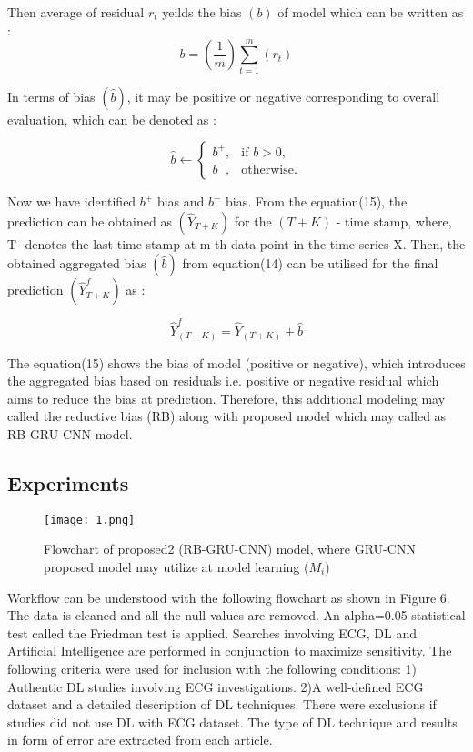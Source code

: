 Then average of residual $r_{t}$ yeilds the bias $({b})$ of model which can be written as :
\begin{equation}
  {b} = \left ( \frac{1}{m} \right ) \sum_{t=1}^m\left ( r_{t} \right )
\end{equation}

In terms of bias $(\hat{b})$,  it may be positive or negative corresponding to overall evaluation,  which can be denoted as :
 
\begin{equation}
 {\hat{b}} \leftarrow   \begin {cases}  b^+,  & \text{if } b >  0,  \\
    b^-,  & \text{otherwise}. \end{cases}
\end{equation}

Now we have identified $b^+$ bias and $b^-$ bias. From the equation(15),  the prediction can be obtained as $(\hat{Y}_{T+K})$ for the $(T+K)$ - time stamp,  where,  T- denotes the last time stamp at m-th data point in the time series X. Then,  the obtained aggregated bias $(\hat{b})$ from equation(14) can be utilised for the final prediction $(\hat{Y}_{T+K}^f)$ as :

\begin{equation}
    \hat{Y}_{(T+K)}^f = \hat{Y}_{(T+K)} + \hat{b}
\end{equation}

The equation(15) shows the bias of model (positive or negative),  which introduces the aggregated bias based on residuals i.e. positive or negative residual which aims to reduce the bias at prediction. Therefore,  this additional modeling may called the reductive bias (RB) along with proposed model which may called as RB-GRU-CNN model.
 
\subsection{Experiments}

  \begin{figure*}[h!]
  	\centering
  	\texttt{[image: 1.png]}
          \caption{Flowchart of proposed2 (RB-GRU-CNN) model,  where GRU-CNN proposed model may utilize at model learning ($M_i$)}
  	\label{Fig:11}
  \end{figure*}

Workflow can be understood with the following flowchart as shown in Figure 6. The data is cleaned and all the null values are removed. An alpha=0.05 statistical test called the Friedman test is applied. Searches involving ECG,  DL and Artificial Intelligence are performed in conjunction to maximize sensitivity. The following criteria were used for inclusion with the following conditions: 1) Authentic DL studies involving ECG investigations. 2)A well-defined ECG dataset and a detailed description of DL techniques. There were exclusions if studies did not use DL with ECG dataset. The type of DL technique and results in form of error are extracted from each article.


